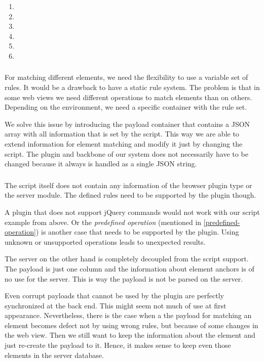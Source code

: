 \begin{enumerate}
\item \reqSi
\item \reqSii
\item \reqSiii
\item \reqSiv
\item \reqSv
\item \reqSvi
\end{enumerate}

\subsubsection[Information Container]{\reqSi}

For matching different elements, we need the flexibility to use a variable set of rules. It would be a drawback to have a static rule system. The problem is that in some web views we need different operations to match elements than on others. Depending on the environment, we need a specific container with the rule set. 

We solve this issue by introducing the payload container that contains a JSON array with all information that is set by the script. This way we are able to extend information for element matching and modify it just by changing the script. The plugin and backbone of our system does not necessarily have to be changed because it always is handled as a single JSON string.

\subsubsection[Decoupling]{\reqSii}\label{decoupled-req}

The script itself does not contain any information of the browser plugin type or the server module. The defined rules need to be supported by the plugin though. 

A plugin that does not support jQuery commands would not work with our script example from above. Or the \emph{predefined operation} (mentioned in \ref{predefined-operation}) is another case that needs to be supported by the plugin. Using unknown or unsupported operations leads to unexpected results.  

The server on the other hand is completely decoupled from the script support. The payload is just one column and the information about element anchors is of no use for the server. This is way the payload is not be parsed on the server. 

Even corrupt payloads that cannot be used by the plugin are perfectly synchronized at the back end. This might seem not much of use at first appearance. Nevertheless, there is the case when a the payload for matching an element becomes defect not by using wrong rules, but because of some changes in the web view. Then we still want to keep the information about the element and just re-create the payload to it. Hence, it makes sense to keep even those elements in the server database.

